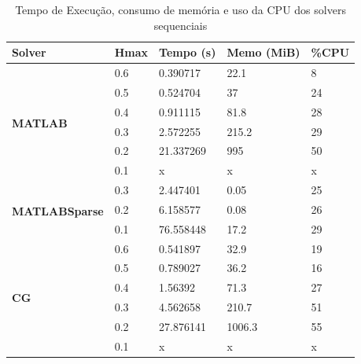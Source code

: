 \documentclass[
    12pt,               %
    openright,          %
    oneside,
    a4paper,            %
    english,            %
    french,             %
    spanish,            %
    brazil              %
    ]{abntex2}
\newcommand{\matlab}{MATLAB\textsuperscript{\textregistered}}
\begin{document}
\begin{table}[]
	\centering
	\caption{Tempo de Execução, consumo de memória e uso da CPU dos solvers sequenciais}
	\label{my-label}
	\begin{tabular}{|l|l|l|l|l|}
		\hline
		\textbf{Solver}                         & \textbf{Hmax} & \textbf{Tempo (s)} & \textbf{Memo (MiB)} & \textbf{\%CPU} \\ \hline
		\multirow{6}{*}{\textbf{\matlab}}        & 0.6           & 0.390717           & 22.1                & 8              \\ \cline{2-5} 
		& 0.5           & 0.524704           & 37                  & 24             \\ \cline{2-5} 
		& 0.4           & 0.911115           & 81.8                & 28             \\ \cline{2-5} 
		& 0.3           & 2.572255           & 215.2               & 29             \\ \cline{2-5} 
		& 0.2           & 21.337269          & 995                 & 50             \\ \cline{2-5} 
		& 0.1           & x                  & x                   & x              \\ \hline
		\multirow{3}{*}{\textbf{\matlab Sparse}} & 0.3           & 2.447401           & 0.05                & 25             \\ \cline{2-5} 
		& 0.2           & 6.158577           & 0.08                & 26             \\ \cline{2-5} 
		& 0.1           & 76.558448          & 17.2                & 29             \\ \hline
		\multirow{6}{*}{\textbf{CG}}            & 0.6           & 0.541897           & 32.9                & 19             \\ \cline{2-5} 
		& 0.5           & 0.789027           & 36.2                & 16             \\ \cline{2-5} 
		& 0.4           & 1.56392            & 71.3                & 27             \\ \cline{2-5} 
		& 0.3           & 4.562658           & 210.7               & 51             \\ \cline{2-5} 
		& 0.2           & 27.876141          & 1006.3              & 55             \\ \cline{2-5} 
		& 0.1           & x                  & x                   & x              \\ \hline

\end{tabular}
\end{table}
\end{document}
